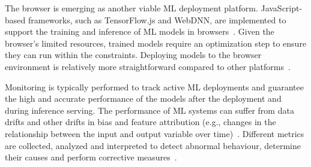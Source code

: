 The browser is emerging as another viable ML deployment platform. JavaScript-based frameworks, such as TensorFlow.js and WebDNN, are implemented to support the training and inference of ML models in browsers~\cite{Ma}. Given the browser's limited resources, trained models require an optimization step to ensure they can run within the constraints. Deploying models to the browser environment is relatively more straightforward compared to other platforms~\cite{Chen}.

Monitoring is typically performed to track active ML deployments and guarantee the high and accurate performance of the models after the deployment and during inference serving. The performance of ML systems can suffer from data drifts and other drifts in bias and feature attribution (e.g., changes in the relationship between the input and output variable over time)~\cite{Nigenda}. Different metrics are collected, analyzed and interpreted to detect abnormal behaviour, determine their causes and perform corrective measures~\cite{Nigenda}.

